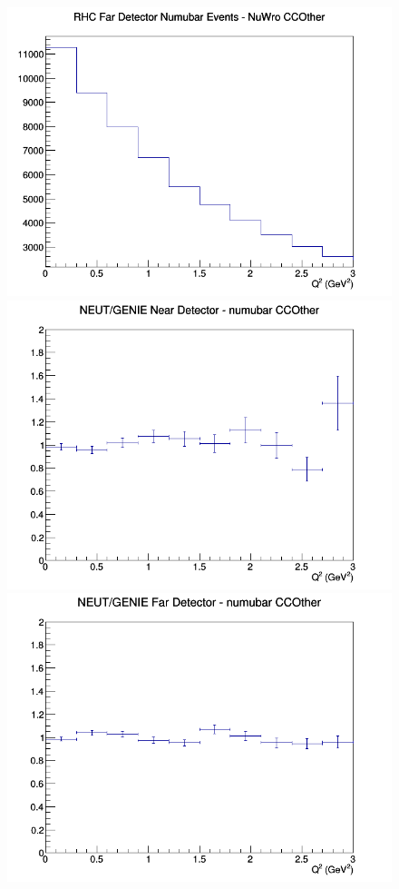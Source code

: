 \begin{figure}[h]
\endminipage
{}
\includegraphics[width=\linewidth]{eff_Q2/FGT/CCOther_RHC_FD_numubar_Q2_NuWro.png}
\endminipage
\newline
{}
\includegraphics[width=\linewidth]{eff_Q2/FGT/ratios/CCOther_NEUT_GENIE_numubar_near_Q2.png}
\endminipage
{}
\includegraphics[width=\linewidth]{eff_Q2/FGT/ratios/CCOther_NEUT_GENIE_numubar_far_Q2.png}

\end{figure}
